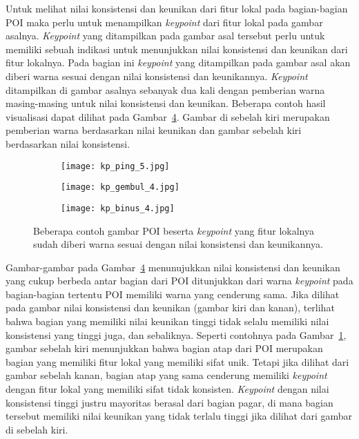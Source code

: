 Untuk melihat nilai konsistensi dan keunikan dari fitur lokal pada bagian-bagian POI maka perlu untuk menampilkan \textit{keypoint} dari fitur lokal pada gambar asalnya. \textit{Keypoint} yang ditampilkan pada gambar asal tersebut perlu untuk memiliki sebuah indikasi untuk menunjukkan nilai konsistensi dan keunikan dari fitur lokalnya. Pada bagian ini \textit{keypoint} yang ditampilkan pada gambar asal akan diberi warna sesuai dengan nilai konsistensi dan keunikannya.  \textit{Keypoint} ditampilkan di gambar asalnya sebanyak dua kali dengan pemberian warna masing-masing untuk nilai konsistensi dan keunikan. Beberapa contoh hasil visualisasi dapat dilihat pada Gambar~\ref{fig:contoh_visualisasi_clustering}. Gambar di sebelah kiri merupakan pemberian warna berdasarkan nilai keunikan dan gambar sebelah kiri berdasarkan nilai konsistensi.
\begin{figure}[H]
	\centering
	\begin{subfigure}{\textwidth}
		\texttt{[image: kp\_ping\_5.jpg]}
		\caption{}
		\label{fig:contoh_visualisasi_clustering_1}
	\end{subfigure}
	\begin{subfigure}{\textwidth}
		\texttt{[image: kp\_gembul\_4.jpg]}
		\caption{}
		\label{fig:contoh_visualisasi_clustering_2}
	\end{subfigure}
	\begin{subfigure}{\textwidth}
		\texttt{[image: kp\_binus\_4.jpg]}
		\caption{}
		\label{fig:contoh_visualisasi_clustering_3}
	\end{subfigure}
	\caption{Beberapa contoh gambar POI beserta \textit{keypoint} yang fitur lokalnya sudah diberi warna sesuai dengan nilai konsistensi dan keunikannya.}
	\label{fig:contoh_visualisasi_clustering}
\end{figure}
Gambar-gambar pada Gambar~\ref{fig:contoh_visualisasi_clustering} menunujukkan nilai konsistensi dan keunikan yang cukup berbeda antar bagian dari POI ditunjukkan dari warna \textit{keypoint} pada bagian-bagian tertentu POI memiliki warna yang cenderung sama. Jika dilihat pada gambar nilai konsistensi dan keunikan (gambar kiri dan kanan), terlihat bahwa bagian yang memiliki nilai keunikan tinggi tidak selalu memiliki nilai konsistensi yang tinggi juga, dan sebaliknya. Seperti contohnya pada Gambar~\ref{fig:contoh_visualisasi_clustering_1}, gambar sebelah kiri menunjukkan bahwa bagian atap dari POI merupakan bagian yang memiliki fitur lokal yang memiliki sifat unik. Tetapi jika dilihat dari gambar sebelah kanan, bagian atap yang sama cenderung memiliki \textit{keypoint} dengan fitur lokal yang memiliki sifat tidak konsisten. \textit{Keypoint} dengan nilai konsistensi tinggi justru mayoritas berasal dari bagian pagar, di mana bagian tersebut memiliki nilai keunikan yang tidak terlalu tinggi jika dilihat dari gambar di sebelah kiri.


